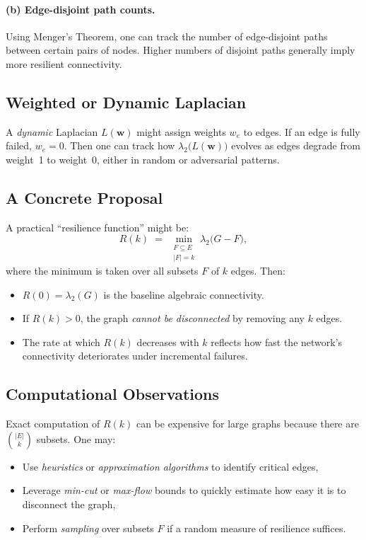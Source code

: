 \paragraph{(b) Edge-disjoint path counts.}
Using Menger's Theorem, one can track the number of edge-disjoint paths between certain pairs of nodes. Higher numbers of disjoint paths generally imply more resilient connectivity.

\subsection{Weighted or Dynamic Laplacian}

A \emph{dynamic} Laplacian $L(\mathbf{w})$ might assign weights $w_e$ to edges. If an edge is fully failed, $w_e=0$. Then one can track how $\lambda_2\bigl(L(\mathbf{w})\bigr)$ evolves as edges degrade from weight~1 to weight~0, either in random or adversarial patterns.

\subsection{A Concrete Proposal}

A practical ``resilience function'' might be:
\[
  R(k)
  \;=\;
  \min_{\substack{F \subseteq E\\|F| = k}}
  \lambda_2\!\bigl(G - F\bigr),
\]
where the minimum is taken over all subsets $F$ of $k$ edges. Then:
\begin{itemize}
\item $R(0) = \lambda_2(G)$ is the baseline algebraic connectivity.
\item If $R(k) > 0$, the graph \emph{cannot be disconnected} by removing any $k$ edges. 
\item The rate at which $R(k)$ decreases with $k$ reflects how fast the network's connectivity deteriorates under incremental failures.
\end{itemize}

\subsection{Computational Observations}
Exact computation of $R(k)$ can be expensive for large graphs because there are $\binom{|E|}{k}$ subsets. One may:
\begin{itemize}
\item Use \emph{heuristics} or \emph{approximation algorithms} to identify critical edges,
\item Leverage \emph{min-cut} or \emph{max-flow} bounds to quickly estimate how easy it is to disconnect the graph,
\item Perform \emph{sampling} over subsets $F$ if a random measure of resilience suffices.
\end{itemize}

